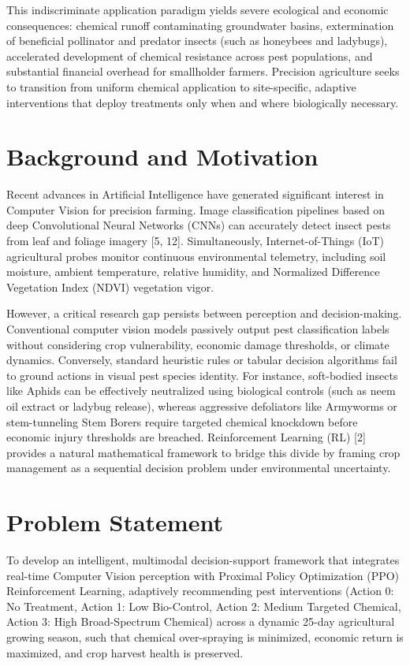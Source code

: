 \documentclass[12pt,a4paper]{report}
\begin{document}
This indiscriminate application paradigm yields severe ecological and economic consequences: chemical runoff contaminating groundwater basins, extermination of beneficial pollinator and predator insects (such as honeybees and ladybugs), accelerated development of chemical resistance across pest populations, and substantial financial overhead for smallholder farmers. Precision agriculture seeks to transition from uniform chemical application to site-specific, adaptive interventions that deploy treatments only when and where biologically necessary.

\section{Background and Motivation}
Recent advances in Artificial Intelligence have generated significant interest in Computer Vision for precision farming. Image classification pipelines based on deep Convolutional Neural Networks (CNNs) can accurately detect insect pests from leaf and foliage imagery [5, 12]. Simultaneously, Internet-of-Things (IoT) agricultural probes monitor continuous environmental telemetry, including soil moisture, ambient temperature, relative humidity, and Normalized Difference Vegetation Index (NDVI) vegetation vigor.

However, a critical research gap persists between perception and decision-making. Conventional computer vision models passively output pest classification labels without considering crop vulnerability, economic damage thresholds, or climate dynamics. Conversely, standard heuristic rules or tabular decision algorithms fail to ground actions in visual pest species identity. For instance, soft-bodied insects like Aphids can be effectively neutralized using biological controls (such as neem oil extract or ladybug release), whereas aggressive defoliators like Armyworms or stem-tunneling Stem Borers require targeted chemical knockdown before economic injury thresholds are breached. Reinforcement Learning (RL) [2] provides a natural mathematical framework to bridge this divide by framing crop management as a sequential decision problem under environmental uncertainty.

\section{Problem Statement}
To develop an intelligent, multimodal decision-support framework that integrates real-time Computer Vision perception with Proximal Policy Optimization (PPO) Reinforcement Learning, adaptively recommending pest interventions (Action 0: No Treatment, Action 1: Low Bio-Control, Action 2: Medium Targeted Chemical, Action 3: High Broad-Spectrum Chemical) across a dynamic 25-day agricultural growing season, such that chemical over-spraying is minimized, economic return is maximized, and crop harvest health is preserved.
\end{document}

